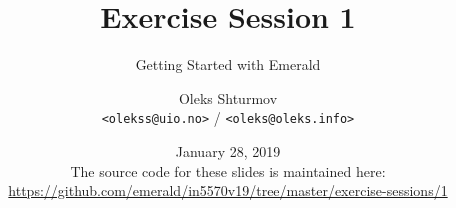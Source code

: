 \documentclass[xcolor=table]{beamer}
\title{{\Large Exercise Session 1}}
\subtitle{Getting Started with Emerald}
\institute{{\large University of Oslo}\\[0.2em] IN[59]570: Distributed Objects}
\author{Oleks Shturmov\\[-0.2em]%
  {\tiny \texttt{<olekss@uio.no>} / \texttt{<oleks@oleks.info>}}
}
\date{January 28, 2019\\[2em]
{\scriptsize The source code for these slides is maintained here: \\[-0.5em] {\tiny%
\url{https://github.com/emerald/in5570v19/tree/master/exercise-sessions/1}}%
}}
\begin{document}
\begin{frame} \titlepage \end{frame}


















\end{document}
